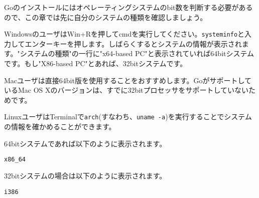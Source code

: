 Goのインストールにはオペレーティングシステムのbit数を判断する必要があるので、この章では先に自分のシステムの種類を確認しましょう。

WindowsのユーザはWin+Rを押してcmdを実行してください。\texttt{systeminfo}と入力してエンターキーを押します。しばらくするとシステムの情報が表示されます。"システムの種類"の一行に"x64-based PC"と表示されていれば64bitシステムです。もし"X86-based PC"とあれば、32bitシステムです。

Macユーザは直接64bit版を使用することをおすすめします。GoがサポートしているMac OS Xのバージョンは、すでに32bitプロセッサをサポートしていないためです。

LinuxユーザはTerminalで\texttt{arch}(すなわち、\texttt{uname -a})を実行することでシステムの情報を確かめることができます。

64bitシステムであれば以下のように表示されます。

\begin{lstlisting}[numbers=none]
x86_64
\end{lstlisting}

32bitシステムの場合は以下のように表示されます。

\begin{lstlisting}[numbers=none]
i386
\end{lstlisting}
